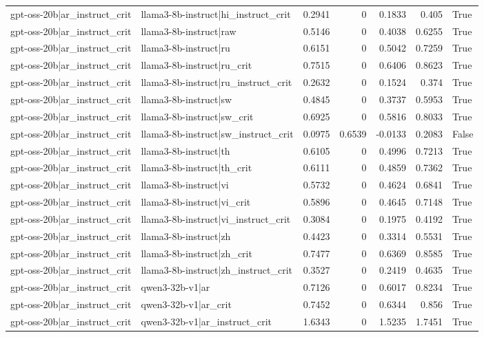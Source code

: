 \begin{table}
\begin{tabular}{l l r r r r l}
gpt-oss-20b|ar_instruct_crit & llama3-8b-instruct|hi_instruct_crit & 0.2941 & 0 & 0.1833 & 0.405 & True \\
gpt-oss-20b|ar_instruct_crit & llama3-8b-instruct|raw & 0.5146 & 0 & 0.4038 & 0.6255 & True \\
gpt-oss-20b|ar_instruct_crit & llama3-8b-instruct|ru & 0.6151 & 0 & 0.5042 & 0.7259 & True \\
gpt-oss-20b|ar_instruct_crit & llama3-8b-instruct|ru_crit & 0.7515 & 0 & 0.6406 & 0.8623 & True \\
gpt-oss-20b|ar_instruct_crit & llama3-8b-instruct|ru_instruct_crit & 0.2632 & 0 & 0.1524 & 0.374 & True \\
gpt-oss-20b|ar_instruct_crit & llama3-8b-instruct|sw & 0.4845 & 0 & 0.3737 & 0.5953 & True \\
gpt-oss-20b|ar_instruct_crit & llama3-8b-instruct|sw_crit & 0.6925 & 0 & 0.5816 & 0.8033 & True \\
gpt-oss-20b|ar_instruct_crit & llama3-8b-instruct|sw_instruct_crit & 0.0975 & 0.6539 & -0.0133 & 0.2083 & False \\
gpt-oss-20b|ar_instruct_crit & llama3-8b-instruct|th & 0.6105 & 0 & 0.4996 & 0.7213 & True \\
gpt-oss-20b|ar_instruct_crit & llama3-8b-instruct|th_crit & 0.6111 & 0 & 0.4859 & 0.7362 & True \\
gpt-oss-20b|ar_instruct_crit & llama3-8b-instruct|vi & 0.5732 & 0 & 0.4624 & 0.6841 & True \\
gpt-oss-20b|ar_instruct_crit & llama3-8b-instruct|vi_crit & 0.5896 & 0 & 0.4645 & 0.7148 & True \\
gpt-oss-20b|ar_instruct_crit & llama3-8b-instruct|vi_instruct_crit & 0.3084 & 0 & 0.1975 & 0.4192 & True \\
gpt-oss-20b|ar_instruct_crit & llama3-8b-instruct|zh & 0.4423 & 0 & 0.3314 & 0.5531 & True \\
gpt-oss-20b|ar_instruct_crit & llama3-8b-instruct|zh_crit & 0.7477 & 0 & 0.6369 & 0.8585 & True \\
gpt-oss-20b|ar_instruct_crit & llama3-8b-instruct|zh_instruct_crit & 0.3527 & 0 & 0.2419 & 0.4635 & True \\
gpt-oss-20b|ar_instruct_crit & qwen3-32b-v1|ar & 0.7126 & 0 & 0.6017 & 0.8234 & True \\
gpt-oss-20b|ar_instruct_crit & qwen3-32b-v1|ar_crit & 0.7452 & 0 & 0.6344 & 0.856 & True \\
gpt-oss-20b|ar_instruct_crit & qwen3-32b-v1|ar_instruct_crit & 1.6343 & 0 & 1.5235 & 1.7451 & True \\

\end{tabular}
\end{table}
